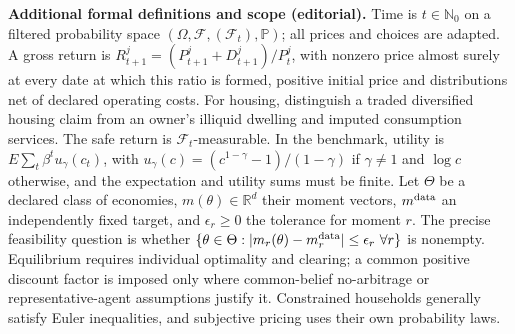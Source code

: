 \documentclass[11pt,a4paper]{article}
\begin{document}
\textbf{Additional formal definitions and scope (editorial).} Time is \(t\in\mathbb N_0\) on a filtered probability space \((\Omega,\mathcal F,(\mathcal F_t),\mathbb P)\); all prices and choices are adapted. A gross return is \(R^j_{t+1}=(P^j_{t+1}+D^j_{t+1})/P^j_t\), with nonzero price almost surely at every date at which this ratio is formed, positive initial price and distributions net of declared operating costs. For housing, distinguish a traded diversified housing claim from an owner's illiquid dwelling and imputed consumption services. The safe return is \(\mathcal F_t\)-measurable. In the benchmark, utility is \(E\sum_t\beta^t u_\gamma(c_t)\), with \(u_\gamma(c)=(c^{1-\gamma}-1)/(1-\gamma)\) if \(\gamma\ne1\) and \(\log c\) otherwise, and the expectation and utility sums must be finite. Let \(\Theta\) be a declared class of economies, \(m(\theta)\in\mathbb R^d\) their moment vectors, \(m^{\rm data}\) an independently fixed target, and \(\epsilon_r\geq0\) the tolerance for moment \(r\). The precise feasibility question is whether \(\{\theta\in\Theta:|m_r(\theta)-m_r^{\rm data}|\leq\epsilon_r\ \forall r\}\) is nonempty. Equilibrium requires individual optimality and clearing; a common positive discount factor is imposed only where common-belief no-arbitrage or representative-agent assumptions justify it. Constrained households generally satisfy Euler inequalities, and subjective pricing uses their own probability laws.
\end{document}
